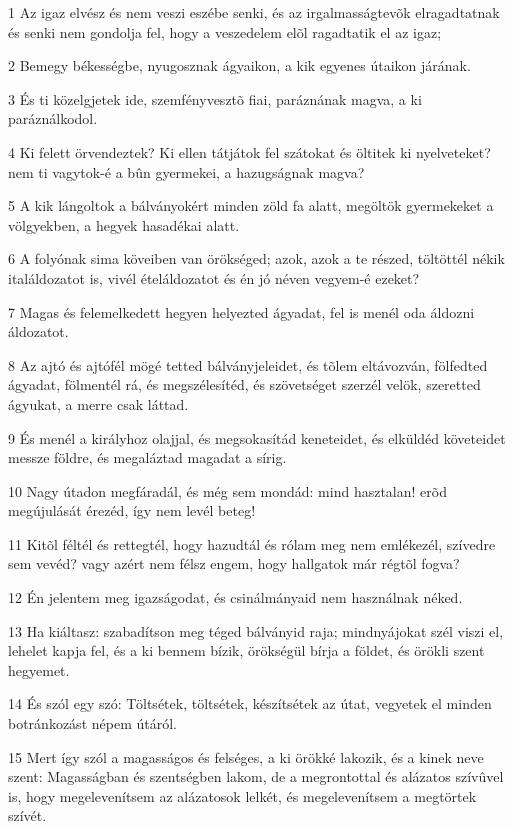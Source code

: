 \par 1 Az igaz elvész és nem veszi eszébe senki, és az irgalmasságtevõk elragadtatnak és senki nem gondolja fel, hogy a veszedelem elõl ragadtatik el az igaz;
\par 2 Bemegy békességbe, nyugosznak ágyaikon, a kik egyenes útaikon járának.
\par 3 És ti közelgjetek ide, szemfényvesztõ fiai, paráznának magva, a ki paráználkodol.
\par 4 Ki felett örvendeztek? Ki ellen tátjátok fel szátokat és öltitek ki nyelveteket? nem ti vagytok-é a bûn gyermekei, a hazugságnak magva?
\par 5 A kik lángoltok a bálványokért minden zöld fa alatt,  megöltök gyermekeket a völgyekben, a hegyek hasadékai alatt.
\par 6 A folyónak sima köveiben van örökséged; azok, azok a te részed, töltöttél nékik italáldozatot is, vivél ételáldozatot és én jó néven vegyem-é ezeket?
\par 7 Magas és felemelkedett hegyen helyezted ágyadat, fel is menél oda áldozni áldozatot.
\par 8 Az ajtó és ajtófél mögé tetted bálványjeleidet, és tõlem eltávozván, fölfedted ágyadat, fölmentél rá, és megszélesítéd, és szövetséget szerzél velök, szeretted ágyukat, a merre csak láttad.
\par 9 És menél a királyhoz olajjal, és megsokasítád keneteidet, és elküldéd követeidet messze földre, és megaláztad magadat a sírig.
\par 10 Nagy útadon megfáradál, és még sem mondád: mind hasztalan! erõd megújulását érezéd, így nem levél beteg!
\par 11 Kitõl féltél és rettegtél, hogy hazudtál és rólam meg nem emlékezél, szívedre sem vevéd? vagy azért nem félsz engem, hogy hallgatok már régtõl fogva?
\par 12 Én jelentem meg igazságodat, és csinálmányaid nem használnak néked.
\par 13 Ha kiáltasz: szabadítson meg téged bálványid raja; mindnyájokat szél viszi el, lehelet kapja fel, és a ki bennem bízik, örökségül bírja a földet, és örökli szent hegyemet.
\par 14 És szól egy szó: Töltsétek, töltsétek, készítsétek az útat, vegyetek el minden botránkozást népem útáról.
\par 15 Mert így szól a magasságos és felséges, a ki örökké lakozik, és a kinek neve szent: Magasságban és szentségben lakom, de a megrontottal és alázatos szívûvel is, hogy megelevenítsem az alázatosok lelkét, és megelevenítsem a megtörtek szívét.
